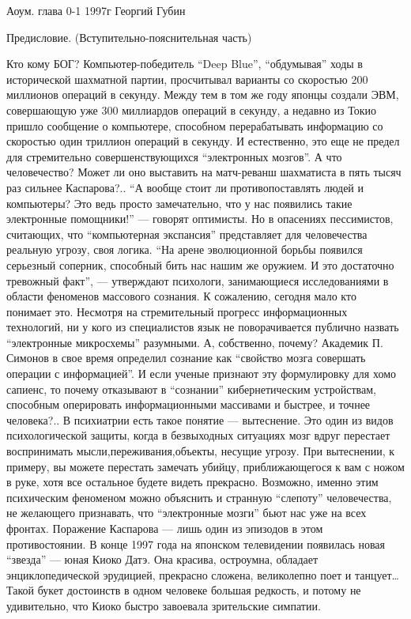 Аоум. глава 0-1 1997г
Георгий Губин
 
Предисловие. (Вступительно-пояснительная часть)
                              
                                   Кто кому БОГ?
Компьютер-победитель ``Deep Blue'', ``обдумывая'' ходы в исторической шахматной партии, просчитывал варианты со скоростью 200 миллионов операций в секунду. Между тем в том же году японцы создали ЭВМ, совершающую уже 300 миллиардов операций в секунду, а недавно из Токио пришло сообщение о компьютере, способном перерабатывать информацию со скоростью один триллион операций в секунду. И естественно, это еще не предел для стремительно совершенствующихся ``электронных мозгов''. 
А что человечество? Может ли оно выставить на матч-реванш шахматиста в пять тысяч раз сильнее Каспарова?.. 
``А вообще стоит ли противопоставлять людей и компьютеры? Это ведь просто замечательно, что у нас появились такие электронные помощники!'' — говорят оптимисты. 
Но в опасениях пессимистов, считающих, что ``компьютерная экспансия'' представляет для человечества реальную угрозу, своя логика. 
``На арене эволюционной борьбы появился серьезный соперник, способный бить нас нашим же оружием. И это достаточно тревожный факт'', — утверждают психологи, занимающиеся исследованиями в области феноменов массового сознания. 
К сожалению, сегодня мало кто понимает это. Несмотря на стремительный прогресс информационных технологий, ни у кого из специалистов язык не поворачивается публично назвать ``электронные микросхемы'' разумными. А, собственно, почему? 
Академик П. Симонов в свое время определил сознание как ``свойство мозга совершать операции с информацией''. И если ученые признают эту формулировку для хомо сапиенс, то почему отказывают в ``сознании'' кибернетическим устройствам, способным оперировать информационными массивами и быстрее, и точнее человека?.. 
В психиатрии есть такое понятие — вытеснение. Это один из видов психологической защиты, когда в безвыходных ситуациях мозг вдруг перестает воспринимать мысли,переживания,объекты, несущие угрозу. При вытеснении, к примеру, вы можете перестать замечать убийцу, приближающегося к вам с ножом в руке, хотя все остальное будете видеть прекрасно. 
Возможно, именно этим психическим феноменом можно объяснить и странную ``слепоту'' человечества, не желающего признавать, что ``электронные мозги'' бьют нас уже на всех фронтах. 
Поражение Каспарова — лишь один из эпизодов в этом противостоянии. 
В конце 1997 года на японском телевидении появилась новая ``звезда'' — юная Киоко Датэ. Она красива, остроумна, обладает энциклопедической эрудицией, прекрасно сложена, великолепно поет и танцует… Такой букет достоинств в одном человеке большая редкость, и потому не удивительно, что Киоко быстро завоевала зрительские симпатии. 
